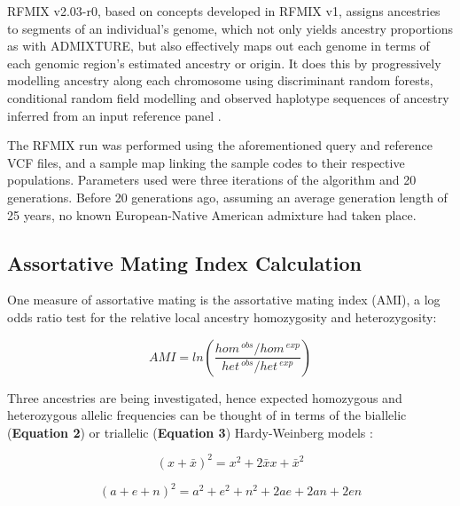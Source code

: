 \documentclass[11pt]{article}
\begin{document}
RFMIX v2.03-r0, based on concepts developed in RFMIX v1, assigns ancestries to segments of an individual's genome, which not only yields ancestry proportions as with ADMIXTURE, but also effectively maps out each genome in terms of each genomic region's estimated ancestry or origin. It does this by progressively modelling ancestry along each chromosome using discriminant random forests, conditional random field modelling and observed haplotype sequences of ancestry inferred from an input reference panel \parencite{Maples2013}.

The RFMIX run was performed using the aforementioned query and reference VCF files, and a sample map linking the sample codes to their respective populations. Parameters used were three iterations of the algorithm and 20 generations. Before 20 generations ago, assuming an average generation length of 25 years, no known European-Native American admixture had taken place.





\subsection{Assortative Mating Index Calculation}


One measure of assortative mating is the assortative mating index (AMI), a log odds ratio test for the relative local ancestry homozygosity and heterozygosity:


\begin{equation}
    AMI = ln{\left( \frac{ hom^{\: obs} / hom^{\: exp} }
                         { het^{\: obs} / het^{\: exp} } \right)}
\end{equation}
\vspace{3mm}


Three ancestries are being investigated, hence expected homozygous and heterozygous allelic frequencies can be thought of in terms of the biallelic (\textbf{Equation 2}) or triallelic (\textbf{Equation 3}) Hardy-Weinberg models \parencite{Norris2019}: 

\begin{equation}
    (x + \bar{x})^{2} = x^{2} + 2\bar{x}x + \bar{x}^{2}
\end{equation}


\begin{equation}
    (a + e + n)^{2} = a^{2} + e^{2} + n^{2} + 2ae + 2an + 2en
\end{equation}
\vspace{3mm}
\end{document}
